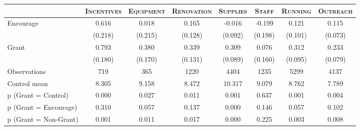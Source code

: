 \begin{tabular*}{\hsize}{@{\hskip\tabcolsep\extracolsep\fill}l*{7}{c}}
\toprule
                    &\multicolumn{1}{c}{\textsc{Incentives}}&\multicolumn{1}{c}{\textsc{Equipment}}&\multicolumn{1}{c}{\textsc{Renovation}}&\multicolumn{1}{c}{\textsc{Supplies}}&\multicolumn{1}{c}{\textsc{Staff}}&\multicolumn{1}{c}{\textsc{Running}}&\multicolumn{1}{c}{\textsc{Outreach}}\\
\midrule
Encourage           &       0.616&       0.018&       0.165&      -0.016&      -0.199&       0.121&       0.115\\
                    &     (0.218)&     (0.215)&     (0.128)&     (0.092)&     (0.198)&     (0.101)&     (0.073)\\
\addlinespace
Grant               &       0.793&       0.380&       0.339&       0.309&       0.076&       0.312&       0.233\\
                    &     (0.180)&     (0.170)&     (0.131)&     (0.089)&     (0.160)&     (0.095)&     (0.079)\\
\midrule
Observations        &         719&         365&        1220&        4404&        1235&        5299&        4137\\
Control mean        &       8.305&       9.158&       8.472&      10.317&       9.079&       8.762&       7.789\\
p (Grant = Control) &       0.000&       0.027&       0.011&       0.001&       0.637&       0.001&       0.004\\
p (Grant = Encourage)&       0.310&       0.057&       0.137&       0.000&       0.146&       0.057&       0.102\\
p (Grant = Non-Grant)&       0.001&       0.011&       0.017&       0.000&       0.225&       0.003&       0.008\\
\bottomrule
\end{tabular*}
